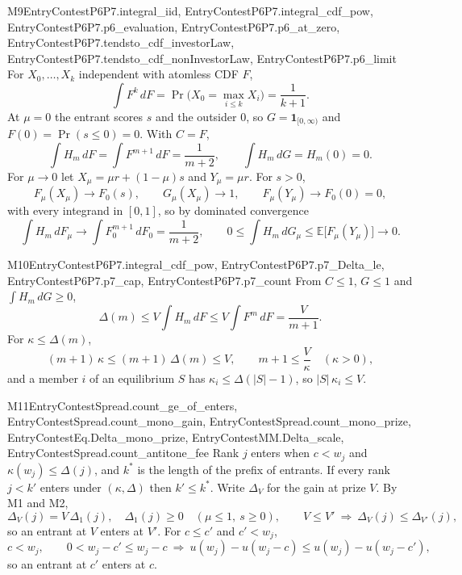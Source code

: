 \begin{mproof}{M9}{EntryContestP6P7.integral_iid, EntryContestP6P7.integral_cdf_pow, EntryContestP6P7.p6_evaluation, EntryContestP6P7.p6_at_zero, EntryContestP6P7.tendsto_cdf_investorLaw, EntryContestP6P7.tendsto_cdf_nonInvestorLaw, EntryContestP6P7.p6_limit}
For $X_0,\dots,X_k$ independent with atomless CDF $F$,
\[
  \int F^k\,dF=\Pr\Big(X_0=\max_{i\le k}X_i\Big)=\frac1{k+1}.
\]
At $\mu=0$ the entrant scores $s$ and the outsider $0$, so
$G=\mathbf 1_{[0,\infty)}$ and $F(0)=\Pr(s\le0)=0$. With $C=F$,
\[
  \int H_m\,dF=\int F^{m+1}\,dF=\frac1{m+2},\qquad \int H_m\,dG=H_m(0)=0 .
\]
For $\mu\to0$ let $X_\mu=\mu r+(1-\mu)s$ and $Y_\mu=\mu r$. For $s>0$,
\[
  F_\mu(X_\mu)\to F_0(s),\qquad G_\mu(X_\mu)\to1,\qquad F_\mu(Y_\mu)\to F_0(0)=0,
\]
with every integrand in $[0,1]$, so by dominated convergence
\[
  \int H_m\,dF_\mu\to\int F_0^{m+1}\,dF_0=\frac1{m+2},\qquad
  0\le\int H_m\,dG_\mu\le\mathbb E\big[F_\mu(Y_\mu)\big]\to0 .
\]
\end{mproof}

\begin{mproof}{M10}{EntryContestP6P7.integral_cdf_pow, EntryContestP6P7.p7_Delta_le, EntryContestP6P7.p7_cap, EntryContestP6P7.p7_count}
From $C\le1$, $G\le1$ and $\int H_m\,dG\ge0$,
\[
  \Delta(m)\le V\int H_m\,dF\le V\int F^m\,dF=\frac V{m+1}.
\]
For $\kappa\le\Delta(m)$,
\[
  (m+1)\,\kappa\le(m+1)\,\Delta(m)\le V,\qquad m+1\le\frac V\kappa\quad(\kappa>0),
\]
and a member $i$ of an equilibrium $S$ has $\kappa_i\le\Delta(|S|-1)$, so
$|S|\,\kappa_i\le V$.
\end{mproof}

\begin{mproof}{M11}{EntryContestSpread.count_ge_of_enters, EntryContestSpread.count_mono_gain, EntryContestSpread.count_mono_prize, EntryContestEq.Delta_mono_prize, EntryContestMM.Delta_scale, EntryContestSpread.count_antitone_fee}
Rank $j$ enters when $c<w_j$ and $\kappa(w_j)\le\Delta(j)$, and $k^*$ is the length of
the prefix of entrants. If every rank $j<k'$ enters under $(\kappa,\Delta)$ then
$k'\le k^*$. Write $\Delta_V$ for the gain at prize $V$. By M1 and M2,
\[
  \Delta_V(j)=V\,\Delta_1(j),\quad \Delta_1(j)\ge0\quad(\mu\le1,\ s\ge0),\qquad
  V\le V'\ \Rightarrow\ \Delta_V(j)\le\Delta_{V'}(j),
\]
so an entrant at $V$ enters at $V'$. For $c\le c'$ and $c'<w_j$,
\[
  c<w_j,\qquad 0<w_j-c'\le w_j-c\ \Rightarrow\ u(w_j)-u(w_j-c)\le u(w_j)-u(w_j-c'),
\]
so an entrant at $c'$ enters at $c$.
\end{mproof}

